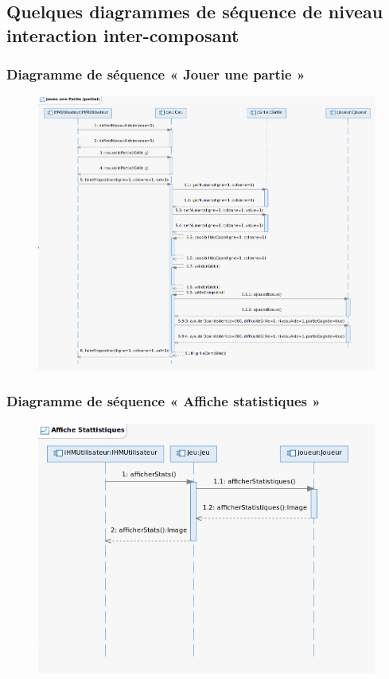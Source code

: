 \documentclass{beamer}
\begin{document}
\subsection{Quelques diagrammes de séquence de niveau interaction inter-composant}
\begin{frame}
  \frametitle{Diagramme de séquence « Jouer une partie »}
  \begin{figure}[h]
    \includegraphics[scale=0.275]{diagrammeSequence_01.png}
  \end{figure}
\end{frame}

\begin{frame}
  \frametitle{Diagramme de séquence « Affiche statistiques »}
  \begin{figure}[h]
    \includegraphics[scale=0.275]{diagrammeSequence_02.png}
  \end{figure}
\end{frame}
\end{document}
